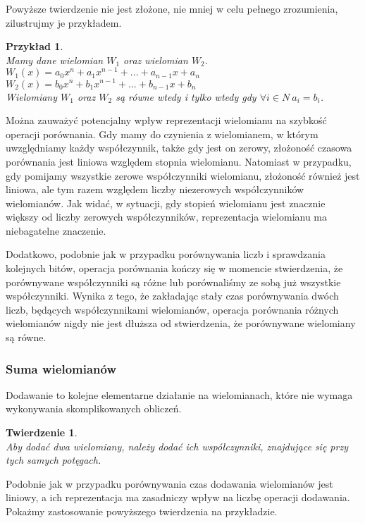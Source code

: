 \documentclass[oneside,a4paper]{book}
\newtheorem{theorem}{Twierdzenie}
\newtheorem{example}{Przykład}
\begin{document}
	Powyższe twierdzenie nie jest złożone, nie mniej w celu pełnego zrozumienia, zilustrujmy je przykładem. 
	
	\begin{example}
		$ $\\
		Mamy dane wielomian $W_1$ oraz wielomian $W_2$. \\
		$W_1(x) = a_0x^n + a_1x^{n-1} + ... + a_{n-1}x + a_n$ \\
		$W_2(x) = b_0x^n + b_1x^{n-1} + ... + b_{n-1}x + b_n$ \\
		Wielomiany $W_1$ oraz $W_2 $ są równe wtedy i tylko wtedy gdy
		$\forall{i\in N}\ a_i = b_i$.
	\end{example}
	
	Można zauważyć potencjalny wpływ reprezentacji wielomianu na szybkość operacji porównania. Gdy mamy do czynienia z wielomianem, w którym uwzględniamy każdy współczynnik, także gdy jest on zerowy, złożoność czasowa porównania jest liniowa względem stopnia wielomianu. Natomiast w przypadku, gdy pomijamy wszystkie zerowe współczynniki wielomianu, złożoność również jest liniowa, ale tym razem względem liczby niezerowych współczynników wielomianów. Jak widać, w sytuacji, gdy stopień wielomianu jest znacznie większy od liczby zerowych współczynników, reprezentacja wielomianu ma niebagatelne znaczenie.
	
	Dodatkowo, podobnie jak w przypadku porównywania liczb i sprawdzania kolejnych bitów, operacja porównania kończy się w momencie stwierdzenia, że porównywane współczynniki są różne lub porównaliśmy ze sobą już wszystkie współczynniki. Wynika z tego, że zakładając stały czas porównywania dwóch liczb, będących współczynnikami wielomianów, operacja porównania różnych wielomianów nigdy nie jest dłuższa od stwierdzenia, że porównywane wielomiany są równe.
	
	\subsubsection{Suma wielomianów}
	
	Dodawanie to kolejne elementarne działanie na wielomianach, które nie wymaga wykonywania skomplikowanych obliczeń.
	
	\begin{theorem}
		$ $\\
		Aby dodać dwa wielomiany, należy dodać ich współczynniki, znajdujące się przy tych samych potęgach.
	\end{theorem}

	Podobnie jak w przypadku porównywania czas dodawania wielomianów jest liniowy, a ich reprezentacja ma zasadniczy wpływ na liczbę operacji dodawania. Pokażmy zastosowanie powyższego twierdzenia na przykładzie.
\end{document}
